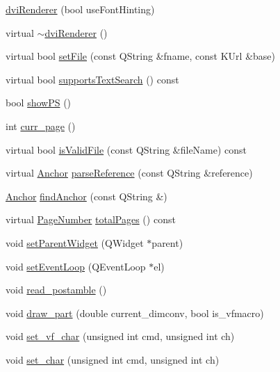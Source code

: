 \begin{DoxyCompactItemize}
\item 
\hyperlink{classdviRenderer_a2954a0104eea3e51bbc9a9c1bada9c49}{dvi\+Renderer} (bool use\+Font\+Hinting)
\item 
virtual \hyperlink{classdviRenderer_ad72e47cc49a85bf48e9a613a02464d3a}{$\sim$dvi\+Renderer} ()
\item 
virtual bool \hyperlink{classdviRenderer_a1e7b4808351b40f86051926f006506d9}{set\+File} (const Q\+String \&fname, const K\+Url \&base)
\item 
virtual bool \hyperlink{classdviRenderer_a19678af601aef8476d304bf33cd40fcb}{supports\+Text\+Search} () const 
\item 
bool \hyperlink{classdviRenderer_a5e971ffab212a0c901e5b40d6466becc}{show\+P\+S} ()
\item 
int \hyperlink{classdviRenderer_a6f13d6edb5d735cf6cd9f0b3bcc5ef06}{curr\+\_\+page} ()
\item 
virtual bool \hyperlink{classdviRenderer_ac97838eefe7ae970c4cd462829267261}{is\+Valid\+File} (const Q\+String \&file\+Name) const 
\item 
virtual \hyperlink{classAnchor}{Anchor} \hyperlink{classdviRenderer_ac86c232ea62e24495bea6ea67a2c01b8}{parse\+Reference} (const Q\+String \&reference)
\item 
\hyperlink{classAnchor}{Anchor} \hyperlink{classdviRenderer_a0f11aa712420cb39bf0909822a4e98bf}{find\+Anchor} (const Q\+String \&)
\item 
virtual \hyperlink{classPageNumber}{Page\+Number} \hyperlink{classdviRenderer_a694e70b7bf8453cab6f6922b4e9d66b7}{total\+Pages} () const 
\item 
void \hyperlink{classdviRenderer_af30d1266141994da13096f793e4fc25b}{set\+Parent\+Widget} (Q\+Widget $\ast$parent)
\item 
void \hyperlink{classdviRenderer_a2fd78732f8a754a69680ba49a7c33dd0}{set\+Event\+Loop} (Q\+Event\+Loop $\ast$el)
\item 
void \hyperlink{classdviRenderer_a86f30945088aa924a9a79ea58d2c0b65}{read\+\_\+postamble} ()
\item 
void \hyperlink{classdviRenderer_a590afd35c11e92d20fe0d8d98a84e2d2}{draw\+\_\+part} (double current\+\_\+dimconv, bool is\+\_\+vfmacro)
\item 
void \hyperlink{classdviRenderer_a7a37517f903bc0446faadfbc4acff6e9}{set\+\_\+vf\+\_\+char} (unsigned int cmd, unsigned int ch)
\item 
void \hyperlink{classdviRenderer_aee61c986d42cdc1f0ac1ff168a4e1663}{set\+\_\+char} (unsigned int cmd, unsigned int ch)

\end{DoxyCompactItemize}

